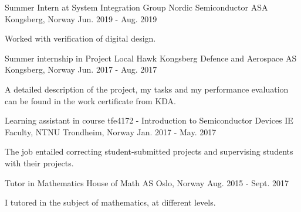 \begin{cventries}
    \cventry
    {Summer Intern at System Integration Group}
    {Nordic Semiconductor ASA}
    {Kongsberg, Norway}
    {Jun. 2019 - Aug. 2019}
    {      
      \begin{cvitems}
        \item {Worked with verification of digital design.}
      \end{cvitems}
    }
    \cventry
    {Summer internship in Project Local Hawk}
    {Kongsberg Defence and Aerospace AS}
    {Kongsberg, Norway}
    {Jun. 2017 - Aug. 2017}
    {      
      \begin{cvitems}
        \item {A detailed description of the project, my tasks and my performance evaluation can be found in the work certificate from KDA.}
      \end{cvitems}
    }
    \cventry
    {Learning assistant in course tfe4172 - Introduction to Semiconductor Devices}
    {IE Faculty, NTNU}
    {Trondheim, Norway}
    {Jan. 2017 - May. 2017}
    {      
      \begin{cvitems}
        \item {The job entailed correcting student-submitted projects and supervising students with their projects.}
      \end{cvitems}
    }
    \cventry
    {Tutor in Mathematics}
    {House of Math AS}
    {Oslo, Norway}
    {Aug. 2015 - Sept. 2017}
    {
      \begin{cvitems}
        \item {I tutored in the subject of mathematics, at different levels.}
      \end{cvitems}
    }
\end{cventries}
